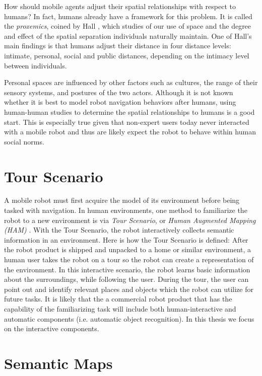 \documentclass[12pt]{gatech-thesis}
\begin{document}
How should mobile agents adjust their spatial relationships with respect to humans? In fact, humans already have a framework for this problem. It is called the \textit{proxemics}, coined by Hall \cite{hall1966hidden}, which studies of our use of space and the degree and effect of the spatial separation individuals naturally maintain. One of Hall's main findings is that humans adjust their distance in four distance levels: intimate, personal, social and public distances, depending on the intimacy level between individuals.

Personal spaces are influenced by other factors such as cultures, the range of their sensory systems, and postures of the two actors. Although it is not known whether it is best to model robot navigation behaviors after humans, using human-human studies to determine the spatial relationships to humans is a good start. This is especially true given that non-expert users today never interacted with a mobile robot and thus are likely expect the robot to behave within human social norms.

\section{Tour Scenario}
\label{sec:tour_scenario}

A mobile robot must first acquire the model of its environment before being tasked with navigation. In human environments, one method to familiarize the robot to a new environment is via \textit{Tour Scenario}, or \textit{Human Augmented Mapping (HAM)} \cite{topp2008human}. With the Tour Scenario, the robot interactively collects semantic information in an environment. Here is how the Tour Scenario is defined: After the robot product is shipped and unpacked to a home or similar environment, a human user takes the robot on a tour so the robot can create a representation of the environment. In this interactive scenario, the robot learns basic information about the surroundings, while following the user. During the tour, the user can point out and identify relevant places and objects which the robot can utilize for future tasks. It is likely that the a commercial robot product that has the capability of the familiarizing task will include both human-interactive and automatic components (i.e. automatic object recognition). In this thesis we focus on the interactive components.

\section{Semantic Maps}
\label{sec:semantic_maps}
\end{document}
